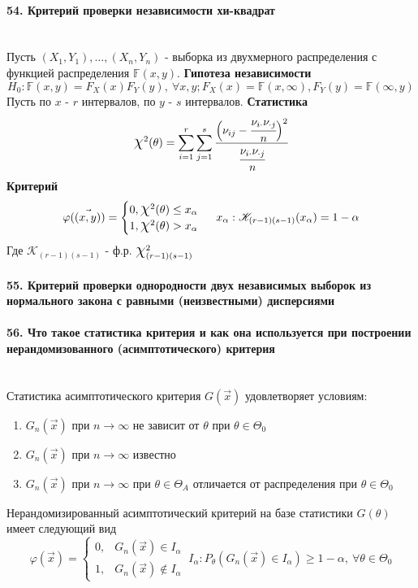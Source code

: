 \documentclass[titlepage]{article}
\newcommand*{\bigchi}{\mbox{\Large$\chi$}} %
\begin{document}
\paragraph{54. Критерий проверки независимости хи-квадрат} ~\\
Пусть $(X_1,Y_1),\dots,(X_n,Y_n)$ - выборка из двухмерного распределения с функцией распределения $\mathbb{F}(x,y)$.
\textbf{Гипотеза независимости}
\[H_0: \mathbb{F}(x,y)=F_X(x)F_Y(y),\ \forall x,y; F_X(x) = \mathbb{F}(x,\infty), F_Y(y) = \mathbb{F}(\infty,y)\]
Пусть по $x$ - $r$ интервалов, по $y$ - $s$ интервалов.
\textbf{Статистика}
\[\bigchi^2(\theta)=\sum_{i=1}^r\sum_{j=1}^s\cfrac{\Big(\nu_{ij}-\cfrac{\nu_{i\cdot}\nu_{\cdot j}}{n}\Big)^2}{\cfrac{\nu_{i\cdot}\nu_{\cdot j}}{n}}\]
\textbf{Критерий}
\[\varphi(\vec {(x,y)}) = \begin{cases}
	0, \bigchi^2(\theta) \leq x_\alpha\\
	1, \bigchi^2(\theta) > x_\alpha
\end{cases}\ x_\alpha: \mathscr{K}_{(r-1)(s-1)}(x_\alpha) = 1 - \alpha\]
Где $\mathscr{K}_{(r-1)(s-1)}$ - ф.р. $\bigchi_{(r-1)(s-1)}^2$

\paragraph{55. Критерий проверки однородности двух независимых выборок из нормального закона с равными (неизвестными) дисперсиями}

\paragraph{56. Что такое статистика критерия и как она используется при построении нерандомизованного (асимптотического) критерия} ~\\
Статистика асимптотического критерия $G(\vec x)$ удовлетворяет условиям:
\begin{enumerate}
	\item $G_n(\vec x)$ при $n \rightarrow \infty$ не зависит от $\theta$ при $\theta \in \Theta_0$
	\item $G_n(\vec x)$ при $n \rightarrow \infty$ известно
	\item $G_n(\vec x)$ при $n \rightarrow \infty$ при $\theta \in \Theta_A$ отличается от распределения при $\theta \in \Theta_0$
\end{enumerate}
Нерандомизированный асимптотический критерий на базе статистики $G(\theta)$ имеет следующий вид
\[\varphi(\vec x) = \begin{cases}
	0, &G_n(\vec x) \in I_\alpha \\
	1, &G_n(\vec x) \notin I_\alpha
\end{cases}\ I_\alpha: P_\theta(G_n(\vec x) \in I_\alpha) \geq 1 - \alpha,\ \forall\theta\in\Theta_0\]
\end{document}
